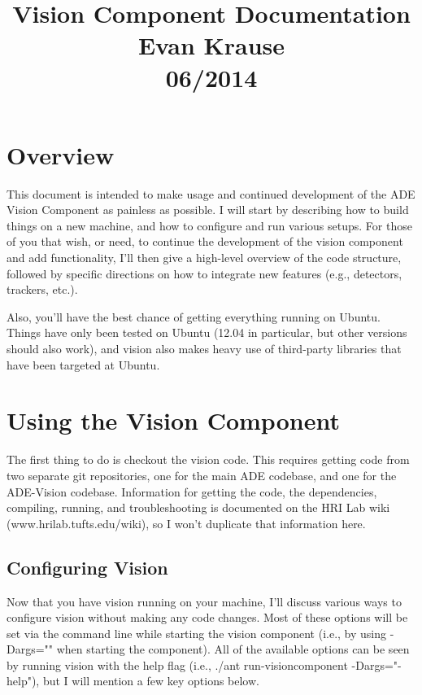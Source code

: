 \documentclass{article}
\date{}
\begin{document}
\title{Vision Component Documentation \\ Evan Krause \\ 06/2014}
\maketitle

\section{Overview}
This document is intended to make usage and continued development of
the ADE Vision Component as painless as possible. I will start by describing
how to build things on a new machine, and how to configure and run
various setups. For those of you that wish, or need, to continue the development
of the vision component and add functionality, I'll then give a high-level
overview of the code structure, followed by specific directions on how to
integrate new features (e.g., detectors, trackers, etc.).

Also, you'll have the best chance of getting everything running on Ubuntu.
Things have only been tested on Ubuntu (12.04 in particular, but other
versions should also work), and vision also makes heavy use of 
third-party libraries that have been targeted at Ubuntu.

\section{Using the Vision Component}
The first thing to do is checkout the vision code. This requires getting code
from two separate git repositories, one for the main ADE codebase, and one for
the ADE-Vision codebase. Information for getting the code, the dependencies,
compiling, running, and troubleshooting is documented on the HRI Lab wiki
(www.hrilab.tufts.edu/wiki), so I won't duplicate that information here.

\subsection{Configuring Vision}
Now that you have vision running on your machine, I'll discuss various
ways to configure vision without making any code changes. Most of these options
will be set via the command line while starting the vision component
(i.e., by using -Dargs="" when starting the component). All of the available
options can be seen by running vision with the help flag
(i.e., ./ant run-visioncomponent -Dargs="-help"), but I will mention a few key
options below.
\end{document}
